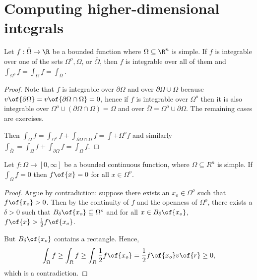 \chapter{Computing higher-dimensional integrals}

\begin{corollary}
	Let $f: \bar{\Omega} \to \R$ be a bounded function where $\Omega \subseteq \R^n$ is simple. If $f$ is integrable over one of the sets $\Omega^o, \Omega$, or $\bar{\Omega}$, then $f$ is integrable over all of them and $\int_{\Omega^o} f = \int_\Omega f = \int_{\bar{\Omega}}$.
\end{corollary}
\begin{proof}
	Note that $f$ is integrable over $\partial \Omega$ and over $\partial \Omega \cup \Omega$ because $v\of{\partial \Omega} = v\of{\partial \Omega \cap \Omega} = 0$, hence if $f$ is integrable over $\Omega^o$ then it is also integrable over $\Omega^o \cup (\partial \Omega \cap \Omega) = \Omega$ and over $\bar{\Omega} = \Omega^o \cup \partial \Omega$. The remaining cases are exercises.

	Then $\int_{\Omega} f = \int_{\Omega^o} f + \int_{\partial \Omega \cap \Omega} f = \int+{\Omega^o} f$ and similarly $\int_{\bar{\Omega}} = \int_\Omega f + \int_{\partial \Omega} f = \int_\Omega f$.
\end{proof}

\begin{theorem}
	Let $f: \Omega \to [0,\infty]$ be a bounded continuous function, where $\Omega \subseteq R^n$ is simple. If $\int_\Omega f = 0$ then $f\of{x} = 0$ for all $x \in \Omega^o$.
\end{theorem}
\begin{proof}
	Argue by contradiction: suppose there exists an $x_o \in \Omega^o$ such that $f\of{x_o} > 0$. Then by the continuity of $f$ and the openness of $\Omega^o$, there exists a $\delta > 0$ such that $B_\delta\of{x_o} \subseteq \Omega^o$ and for all $x \in B_\delta\of{x_o}$, $f\of{x} > \frac{1}{2} f\of{x_o}$.

	But $B_\delta\of{x_o}$ contains a rectangle. Hence, \[\int_\Omega f \geq \int_R f \geq \int_R \frac{1}{2} f\of{x_o} = \frac{1}{2} f\of{x_o} v\of{r} \geq 0,\] which is a contradiction.
\end{proof}


